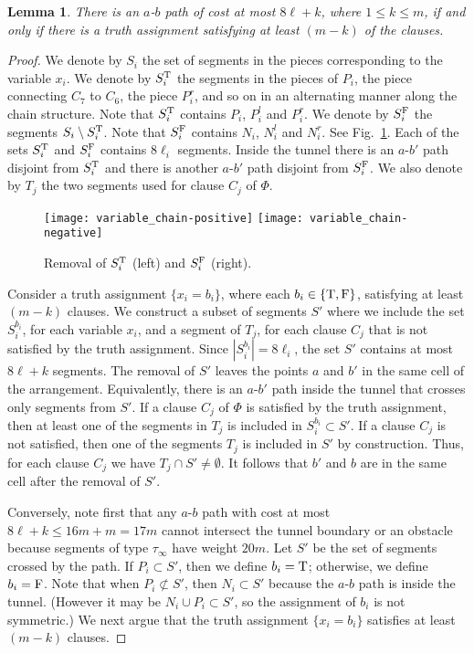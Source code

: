 \documentclass[11pt,a4paper]{article}
\newtheorem{lemma}[definition]{Lemma}
\def\true{{\rm T}}
\def\false{{\rm F}}
\begin{document}
\begin{lemma}\label{sec2_lem:bothdirections}
There is an $a$-$b$ path of cost at most $8\ell + k$, where $1\le k \le m$, if and only if 
there is a truth assignment satisfying at least $(m-k)$ of the clauses.
\end{lemma}
\begin{proof}
We denote by $S_i$ the set of segments in the pieces corresponding to the variable $x_i$.
We denote by $S_i^{\rm T}$ the segments in the pieces of $P_i$, the piece connecting $C_7$ to $C_6$, the piece  $P_i^r$, and so on in an alternating manner along the chain structure. Note that $S_i^{\rm T}$ contains $P_i$, $P_i^l$ and $P_i^r$.
We denote by $S_i^{\rm F}$ the segments $S_i\setminus S_i^{\rm T}$. Note that $S_i^{\rm F}$ contains $N_i$, $N_i^l$ and $N_i^r$.
See Fig.~\ref{chain-posneg}.
Each of the sets $S_i^{\rm T}$ and $S_i^{\rm F}$ contains $8\ell_i$ segments. Inside the tunnel there is an $a$-$b'$ path disjoint from $S_i^{\rm T}$ and there is another $a$-$b'$ path disjoint from $S_i^{\rm F}$. We also denote by $T_j$ the two segments used for clause $C_j$ of $\Phi$.

\begin{figure}
\centering
\hfill
\texttt{[image: variable\_chain-positive]}
\centering
\hfill
\texttt{[image: variable\_chain-negative]}
\hfill
\caption{Removal of $S_i^{\rm T}$ (left) and $S_i^{\rm F}$ (right).}
\label{chain-posneg}
\end{figure}

Consider a truth assignment $\{x_i=b_i\}$, where each $b_i\in \{\true ,\false \}$, satisfying at least $(m-k)$ clauses. We construct a subset of segments $S'$ where we include the set $S_i^{b_i}$, for each variable $x_i$, and a segment of $T_j$, for each clause $C_j$ that is not satisfied by the truth assignment. Since $|S_i^{b_i}|=8\ell_i$, the set $S'$ contains at most $8\ell+ k$ segments. The removal of $S'$ leaves the points $a$ and $b'$ in the same cell of the arrangement. Equivalently, there is an $a$-$b'$ path inside the tunnel that crosses only segments from $S'$. If a clause $C_j$ of $\Phi$ is satisfied by the truth assignment, then at least one of the segments in $T_j$ is included in $S_i^{b_i}\subset S'$. If a clause $C_j$ is not satisfied, then one of the segments $T_j$ is included in $S'$ by construction. Thus, for each clause $C_j$ we have $T_j\cap S'\not= \emptyset$. It follows that $b'$ and $b$ are in the same cell after the removal of $S'$.

Conversely, note first that any $a$-$b$ path with cost at most $8\ell +k\le  16 m+m = 17m$ cannot intersect the tunnel boundary or an obstacle because segments of type $\tau_{\infty}$ have weight $20m$. Let $S'$ be the set of segments crossed by the path. If $P_i\subset S'$, then we define $b_i=\true$; otherwise, we define $b_i=\false$.
Note that when $P_i\not\subset S'$, then $N_i\subset S'$ because the $a$-$b$ path is inside the tunnel. (However it may be $N_i\cup P_i\subset S'$, so the assignment of $b_i$ is not symmetric.) We next argue that the truth assignment $\{x_i=b_i\}$ satisfies at least $(m-k)$ clauses.


\end{proof}
\end{document}
